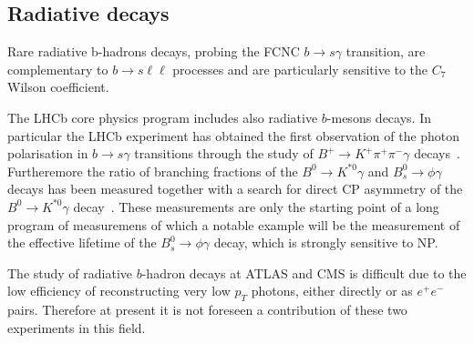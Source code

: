 \subsection{Radiative decays}

Rare radiative b-hadrons decays, probing the FCNC $b\to s \gamma$ transition, are complementary 
to $b\to s \ell \ell $ processes and are particularly sensitive to the $C_7$ Wilson coefficient. 

The LHCb core physics program includes also radiative $b$-mesons decays. 
In particular the LHCb experiment has obtained the first observation of the photon polarisation in $b\to s \gamma$
transitions through the study of $B^+ \to K^+ \pi^+ \pi^-\gamma$ decays~\cite{Aaij:2014wgo}. 
Furtheremore  the ratio of branching fractions of the $B^0\to K^{\ast 0} \gamma$ and $B^0_s\to \phi \gamma$ decays has been measured
together with a search for direct CP asymmetry of the $B^0\to K^{\ast 0}\gamma$ decay~\cite{Aaij:2012ita}.
These measurements are only the starting point of a long program of measuremens of which a notable example will be 
the measurement of the effective lifetime of the $B^0_s \to \phi\gamma$ decay, which is strongly sensitive to NP. 

The study of radiative $b$-hadron decays at ATLAS and CMS is difficult due to the low efficiency of reconstructing very low $p_T$ photons,
either directly or as $e^+e^-$ pairs. Therefore at present it is not foreseen a contribution of these two experiments in this field. 



